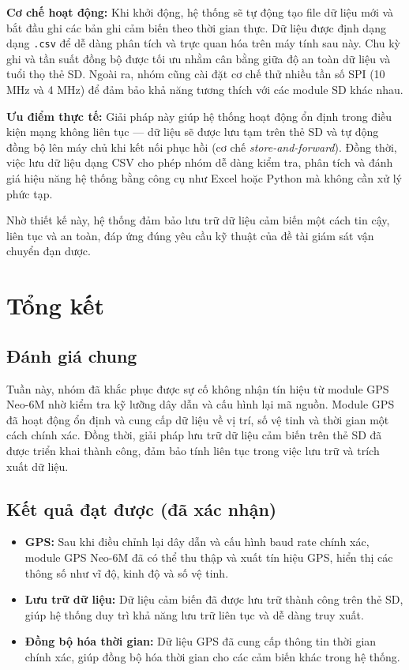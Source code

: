\textbf{Cơ chế hoạt động:}  
Khi khởi động, hệ thống sẽ tự động tạo file dữ liệu mới và bắt đầu ghi các bản ghi cảm biến theo thời gian thực. Dữ liệu được định dạng dạng \texttt{.csv} để dễ dàng phân tích và trực quan hóa trên máy tính sau này. Chu kỳ ghi và tần suất đồng bộ được tối ưu nhằm cân bằng giữa độ an toàn dữ liệu và tuổi thọ thẻ SD. Ngoài ra, nhóm cũng cài đặt cơ chế thử nhiều tần số SPI (10 MHz và 4 MHz) để đảm bảo khả năng tương thích với các module SD khác nhau.

\textbf{Ưu điểm thực tế:}  
Giải pháp này giúp hệ thống hoạt động ổn định trong điều kiện mạng không liên tục — dữ liệu sẽ được lưu tạm trên thẻ SD và tự động đồng bộ lên máy chủ khi kết nối phục hồi (cơ chế \textit{store-and-forward}). Đồng thời, việc lưu dữ liệu dạng CSV cho phép nhóm dễ dàng kiểm tra, phân tích và đánh giá hiệu năng hệ thống bằng công cụ như Excel hoặc Python mà không cần xử lý phức tạp.

Nhờ thiết kế này, hệ thống đảm bảo lưu trữ dữ liệu cảm biến một cách tin cậy, liên tục và an toàn, đáp ứng đúng yêu cầu kỹ thuật của đề tài giám sát vận chuyển đạn dược.

\section{Tổng kết}

\subsection*{Đánh giá chung}  
Tuần này, nhóm đã khắc phục được sự cố không nhận tín hiệu từ module GPS Neo-6M nhờ kiểm tra kỹ lưỡng dây dẫn và cấu hình lại mã nguồn. Module GPS đã hoạt động ổn định và cung cấp dữ liệu về vị trí, số vệ tinh và thời gian một cách chính xác. Đồng thời, giải pháp lưu trữ dữ liệu cảm biến trên thẻ SD đã được triển khai thành công, đảm bảo tính liên tục trong việc lưu trữ và trích xuất dữ liệu.

\subsection*{Kết quả đạt được (đã xác nhận)}  
\begin{itemize} 
\item \textbf{GPS:} Sau khi điều chỉnh lại dây dẫn và cấu hình baud rate chính xác, module GPS Neo-6M đã có thể thu thập và xuất tín hiệu GPS, hiển thị các thông số như vĩ độ, kinh độ và số vệ tinh.
\item \textbf{Lưu trữ dữ liệu:} Dữ liệu cảm biến đã được lưu trữ thành công trên thẻ SD, giúp hệ thống duy trì khả năng lưu trữ liên tục và dễ dàng truy xuất.
\item \textbf{Đồng bộ hóa thời gian:} Dữ liệu GPS đã cung cấp thông tin thời gian chính xác, giúp đồng bộ hóa thời gian cho các cảm biến khác trong hệ thống.
\end{itemize}

